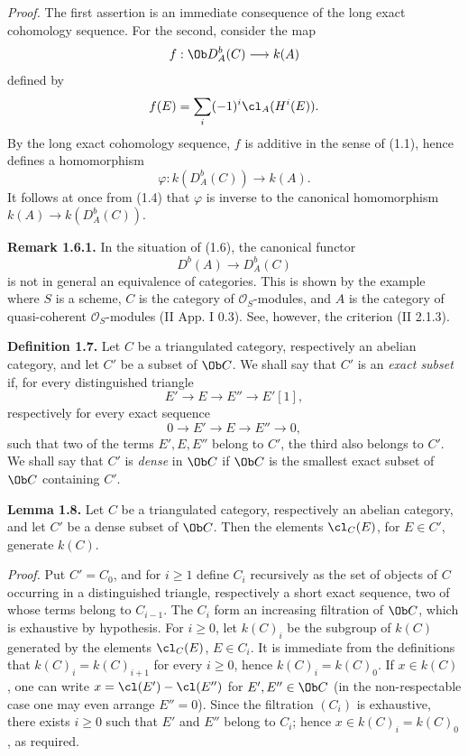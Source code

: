 \emph{Proof.} The first assertion is an immediate consequence of the long exact cohomology sequence. For the second, consider the map
\[
 f:\Ob D_A^b(C)\longrightarrow k(A)
\]
defined by
\[
 f(E)=\sum_i(-1)^i\cl_A(H^i(E)).
\]
By the long exact cohomology sequence, \(f\) is additive in the sense of (1.1), hence defines a homomorphism
\[
 \varphi:k(D_A^b(C))\longrightarrow k(A).
\]
It follows at once from (1.4) that \(\varphi\) is inverse to the canonical homomorphism \(k(A)\to k(D_A^b(C))\).

\textbf{Remark 1.6.1.} In the situation of (1.6), the canonical functor
\[
 D^b(A)\longrightarrow D_A^b(C)
\]
is not in general an equivalence of categories. This is shown by the example where \(S\) is a scheme, \(C\) is the category of \(\mathcal O_S\)-modules, and \(A\) is the category of quasi-coherent \(\mathcal O_S\)-modules (II App. I 0.3). See, however, the criterion (II 2.1.3).

\textbf{Definition 1.7.} Let \(C\) be a triangulated category, respectively an abelian category, and let \(C'\) be a subset of \(\Ob C\). We shall say that \(C'\) is an \emph{exact subset} if, for every distinguished triangle
\[
 E'\longrightarrow E\longrightarrow E''\longrightarrow E'[1],
\]
respectively for every exact sequence
\[
 0\longrightarrow E'\longrightarrow E\longrightarrow E''\longrightarrow0,
\]
such that two of the terms \(E',E,E''\) belong to \(C'\), the third also belongs to \(C'\). We shall say that \(C'\) is \emph{dense} in \(\Ob C\) if \(\Ob C\) is the smallest exact subset of \(\Ob C\) containing \(C'\).

\textbf{Lemma 1.8.} Let \(C\) be a triangulated category, respectively an abelian category, and let \(C'\) be a dense subset of \(\Ob C\). Then the elements \(\cl_C(E)\), for \(E\in C'\), generate \(k(C)\).

\emph{Proof.} Put \(C'=C_0\), and for \(i\geq1\) define \(C_i\) recursively as the set of objects of \(C\) occurring in a distinguished triangle, respectively a short exact sequence, two of whose terms belong to \(C_{i-1}\). The \(C_i\) form an increasing filtration of \(\Ob C\), which is exhaustive by hypothesis. For \(i\geq0\), let \(k(C)_i\) be the subgroup of \(k(C)\) generated by the elements \(\cl_C(E)\), \(E\in C_i\). It is immediate from the definitions that \(k(C)_i=k(C)_{i+1}\) for every \(i\geq0\), hence \(k(C)_i=k(C)_0\). If \(x\in k(C)\), one can write \(x=\cl(E')-\cl(E'')\) for \(E',E''\in\Ob C\) (in the non-respectable case one may even arrange \(E''=0\)). Since the filtration \((C_i)\) is exhaustive, there exists \(i\geq0\) such that \(E'\) and \(E''\) belong to \(C_i\); hence \(x\in k(C)_i=k(C)_0\), as required.

